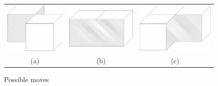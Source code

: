 \begin{problem}
\begin{figure}[htbp]
\vspace{+\baselineskip}
\begin{center}
\begin{tabular}{c@{\quad}c@{\quad}c}
\includegraphics[scale=.5]{j3.eps} &
\includegraphics[scale=.5]{j4.eps} &
\includegraphics[scale=.5]{j5.eps} \\
(a) & (b) & (c)
\end{tabular}
\end{center}
\vspace{-\baselineskip}
\caption{Possible moves}
\end{figure}


\end{problem}
